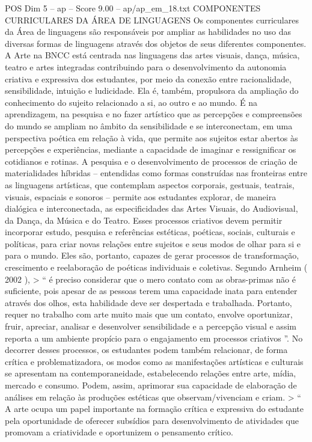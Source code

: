 \begin{textsample}{POS Dim 5 – ap – Score 9.00 – ap/ap\_em\_18.txt}  \label{ex:f5_pos_162}
COMPONENTES CURRICULARES DA ÁREA DE LINGUAGENS Os componentes curriculares da Área de linguagens são responsáveis por ampliar as habilidades no uso das diversas formas de linguagens através dos objetos de seus diferentes componentes.
A Arte na BNCC está centrada nas linguagens das artes visuais, dança, música, teatro e artes integradas contribuindo para o desenvolvimento da autonomia criativa e expressiva dos estudantes, por meio da conexão entre racionalidade, sensibilidade, intuição e ludicidade.
Ela é, também, propulsora da ampliação do conhecimento do sujeito relacionado a si, ao outro e ao mundo.
É na aprendizagem, na pesquisa e no fazer artístico que as percepções e compreensões do mundo se ampliam no âmbito da sensibilidade e se interconectam, em uma perspectiva poética em relação à vida, que permite aos sujeitos estar abertos às percepções e experiências, mediante a capacidade de imaginar e ressignificar os cotidianos e rotinas.
A pesquisa e o desenvolvimento de processos de criação de materialidades híbridas – entendidas como formas construídas nas fronteiras entre as linguagens artísticas, que contemplam aspectos corporais, gestuais, teatrais, visuais, espaciais e sonoros – permite aos estudantes explorar, de maneira dialógica e interconectada, as especificidades das Artes Visuais, do Audiovisual, da Dança, da Música e do Teatro.
Esses processos criativos devem permitir incorporar estudo, pesquisa e referências estéticas, poéticas, sociais, culturais e políticas, para criar novas relações entre sujeitos e seus modos de olhar para si e para o mundo.
Eles são, portanto, capazes de gerar processos de transformação, crescimento e reelaboração de poéticas individuais e coletivas.
Segundo Arnheim ( 2002 ), > “ é preciso considerar que o mero contato com as obras-primas não é suficiente, pois apesar de as pessoas terem uma capacidade inata para entender através dos olhos, esta habilidade deve ser despertada e trabalhada.
Portanto, requer no trabalho com arte muito mais que um contato, envolve oportunizar, fruir, apreciar, analisar e desenvolver sensibilidade e a percepção visual e assim reporta a um ambiente propício para o engajamento em processos criativos ”.
No decorrer desses processos, os estudantes podem também relacionar, de forma crítica e problematizadora, os modos como as manifestações artísticas e culturais se apresentam na contemporaneidade, estabelecendo relações entre arte, mídia, mercado e consumo.
Podem, assim, aprimorar sua capacidade de elaboração de análises em relação às produções estéticas que observam/vivenciam e criam. > “ A arte ocupa um papel importante na formação crítica e expressiva do estudante pela oportunidade de oferecer subsídios para desenvolvimento de atividades que promovam a criatividade e oportunizem o pensamento crítico.

\end{textsample}
